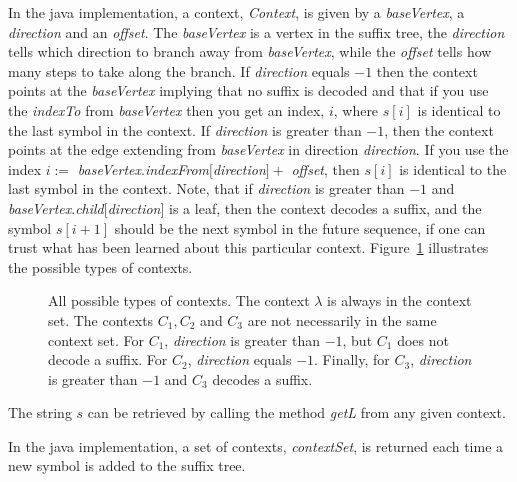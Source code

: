 \documentclass[a4paper,11pt]{report}
\begin{document}
In the java implementation, a context, {\it Context}, is given by a {\it baseVertex}, a {\it direction}
and an {\it offset}. The {\it baseVertex} is a vertex in the suffix tree, the {\it direction} tells
which direction to branch away from {\it baseVertex}, while the {\it offset} tells how many steps to take
along the branch. If {\it direction} equals $-1$ then the context points at the {\it baseVertex} implying
that no suffix is decoded and that if you use the {\it indexTo} from {\it baseVertex} then you get an
index, $i$, where $s[i]$ is identical to the last symbol in the context. If {\it direction} is greater
than $-1$, then the context points at the edge extending from {\it baseVertex} in direction
{\it direction}. If you use the index $i:=$ {\it baseVertex}.{\it indexFrom}$[${\it direction}$] + $
{\it offset}, then $s[i]$ is identical to the last symbol in the context. Note, that if {\it direction}
is greater than $-1$ and {\it baseVertex}.{\it child}$[${\it direction}$]$ is a leaf, then the context
decodes a suffix, and the symbol $s[i+1]$ should be the next symbol in the future sequence, if one can
trust what has been learned about this particular context. Figure~\ref{fig:contexts} illustrates the
possible types of contexts.
\begin{figure}
  \centering
  \caption{All possible types of contexts. The context $\lambda$ is always in the context set. The
  contexts $C_1, C_2$ and $C_3$ are not necessarily in the same context set. For $C_1$, {\it direction}
  is greater than $-1$, but $C_1$ does not decode a suffix. For $C_2$, {\it direction} equals $-1$.
  Finally, for $C_3$, {\it direction} is greater than $-1$ and $C_3$ decodes a suffix.}
  \label{fig:contexts}
\end{figure}

The string $s$ can be retrieved by calling the method {\it getL} from any given context.


In the java implementation, a set of contexts, {\it contextSet}, is returned each time a new symbol
is added to the suffix tree.
\end{document}
